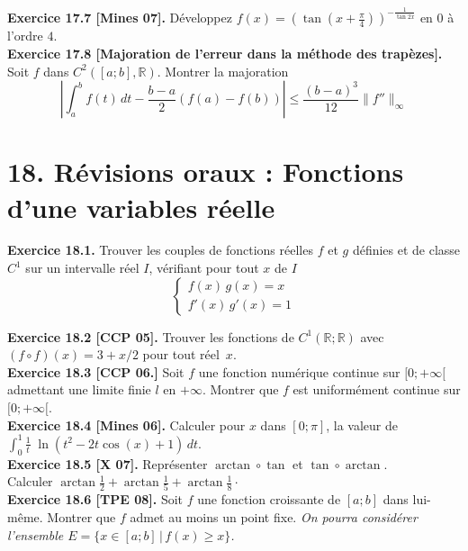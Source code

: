 \documentclass[a4paper,12pt,francais]{article}
\newcommand{\field}[1]{\mathbb{#1}}
\newcommand{\R}{\field{R}}
\begin{document}
\noindent
{\bf Exercice 17.7 [Mines 07].} Développez $f(x)= \displaystyle {
\left( 
\tan \left( x+\frac{\pi}{4} \right) 
\right) }^{-\frac{1}{\tan 2x}}$ en $0$ à l'ordre $4$.\\
  
\noindent
{\bf Exercice 17.8 [Majoration de l'erreur dans la méthode des trapèzes].}
  Soit $f$ dans $C^2([a;b],\R)$. Montrer la majoration
$$\left| \int_a^b f(t)\,dt -\frac{b-a}{2}(f(a)-f(b))
\right| \leqslant \frac{(b-a)^3}{12} \|f''\|_\infty$$

\newpage
\section*{18. Révisions oraux : Fonctions d'une variables réelle} %


\noindent
{\bf Exercice 18.1.} Trouver les couples de fonctions réelles $f$ et $g$
définies et de classe $C^1$ sur un intervalle réel $I$, vérifiant pour
tout $x$ de $I$ 
$$\left\{ {
\begin{array}{l}
f(x)\, g(x) =x\\
f'(x)\, g'(x)=1
\end{array}
}\right.$$

\noindent
{\bf Exercice 18.2 [CCP 05].} Trouver les fonctions de $C^1(\R;\R)$
avec $(f\circ f )(x)=3+x/2$ pour tout réel~$x$.\\

\noindent
{\bf Exercice 18.3 [CCP 06.]} Soit $f$ une fonction numérique continue
sur $[0;+\infty[$ admettant une limite finie $l$ en $+\infty$. Montrer
    que $f$ est uniformément continue sur $[0;+\infty[$.\\

\noindent
{\bf  Exercice 18.4 [Mines 06].} Calculer pour $x$ dans $[0;\pi]$, la
valeur de $\int_0^1 \frac{1}{t} \; \ln(t^2-2t \cos(x) +1)\, dt$.\\

\noindent
{\bf Exercice 18.5 [X 07].} Représenter $\arctan \circ \tan$ et $\tan \circ \arctan$.\\
 Calculer $\arctan \frac{1}{2}+\arctan \frac{1}{5}+\arctan \frac{1}{8} \cdot$\\

 \noindent
 {\bf Exercice 18.6 [TPE 08].} Soit $f$ une fonction croissante de $[a;b]$ dans lui-même. Montrer que $f$ admet au moins un point fixe. {\it On pourra considérer l'ensemble $E=\{x\in [a;b]\, | \, f(x)\geqslant x\}$.}\\ 
 
\end{document}
